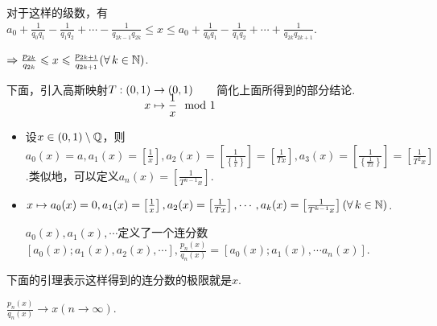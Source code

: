 对于这样的级数，有$a_0+\frac{1}{q_0q_1}-\frac{1}{q_1q_2}+\cdots-\frac{1}{q_{2k-1}q_{2k}}\leq x\leq a_0+\frac{1}{q_0q_1}-\frac{1}{q_1q_2}+\cdots+\frac{1}{q_{2k}q_{2k+1}}$.\par
$\Rightarrow \frac{p_{2k}}{q_{2k}}\leqslant x\leqslant \frac{p_{2k+1}}{q_{2k+1}}(\forall\, k\in\mathbb{N})$.\par
下面，引入高斯映射$\setjot[-4]\begin{aligned}[t]
    T:(0,1) &\to (0,1) \\
    x &\mapsto \frac{1}{x} \mod 1
\end{aligned}$简化上面所得到的部分结论.\par
\begin{itemize}
    \item 设$x\in(0,1)\setminus\mathbb{Q}$，则$a_0(x)=a,a_1(x)=\left[\frac{1}{x}\right],a_2(x)=\left[\frac{1}{\left\{\frac{1}{x}\right\}}\right]=\left[\frac{1}{Tx}\right],a_3(x)=\left[\frac{1}{\left\{\frac{1}{Tx}\right\}}\right]=\left[\frac{1}{T^2x}\right]$.类似地，可以定义$a_n(x)=\left[\frac{1}{T^{n-1}x}\right]$.
    \item $x\mapsto a_0(x)=0,a_1(x)=\left[\frac{1}{x}\right],a_2(x)=\left[\frac{1}{Tx}\right],\cdots,a_k(x)=\left[\frac{1}{T^{k-1}x}\right](\forall\, k\in\mathbb{N})$.\par
    $a_0(x),a_1(x),\cdots$定义了一个连分数$[a_0(x);a_1(x),a_2(x),\cdots],\frac{p_n(x)}{q_n(x)}=[a_0(x);a_1(x),\cdots a_n(x)]$.
\end{itemize}
下面的引理表示这样得到的连分数的极限就是$x$.
\begin{lemma}
    $\frac{p_n(x)}{q_n(x)}\to x(n\to\infty)$.
\end{lemma}

